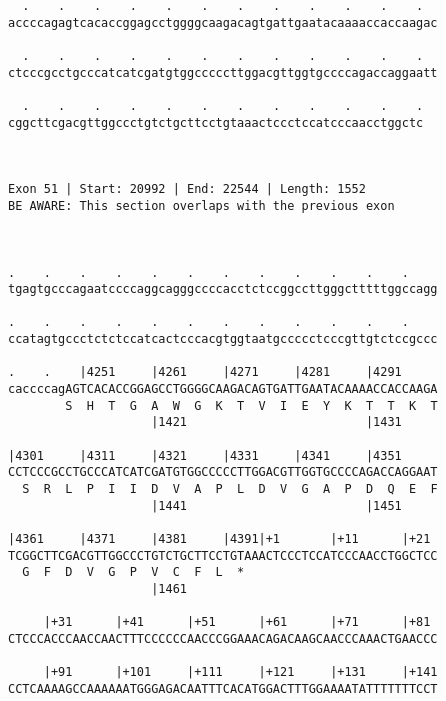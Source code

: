 \documentclass{article}
\begin{document}
\begin{Verbatim}
  .    .    .    .    .    .    .    .    .    .    .    .  
accccagagtcacaccggagcctggggcaagacagtgattgaatacaaaaccaccaagac
                                                            
  .    .    .    .    .    .    .    .    .    .    .    .  
ctcccgcctgcccatcatcgatgtggcccccttggacgttggtgccccagaccaggaatt
                                                            
  .    .    .    .    .    .    .    .    .    .    .    .
cggcttcgacgttggccctgtctgcttcctgtaaactccctccatcccaacctggctc
                                                          
                                                          
 
Exon 51 | Start: 20992 | End: 22544 | Length: 1552
BE AWARE: This section overlaps with the previous exon



.    .    .    .    .    .    .    .    .    .    .    .    
tgagtgcccagaatccccaggcagggccccacctctccggccttgggctttttggccagg
                                                            
.    .    .    .    .    .    .    .    .    .    .    .    
ccatagtgccctctctccatcactcccacgtggtaatgccccctcccgttgtctccgccc
                                                            
.    .    |4251     |4261     |4271     |4281     |4291     
caccccagAGTCACACCGGAGCCTGGGGCAAGACAGTGATTGAATACAAAACCACCAAGA
        S  H  T  G  A  W  G  K  T  V  I  E  Y  K  T  T  K  T
                    |1421                         |1431     
  
|4301     |4311     |4321     |4331     |4341     |4351     
CCTCCCGCCTGCCCATCATCGATGTGGCCCCCTTGGACGTTGGTGCCCCAGACCAGGAAT
  S  R  L  P  I  I  D  V  A  P  L  D  V  G  A  P  D  Q  E  F
                    |1441                         |1451     
  
|4361     |4371     |4381     |4391|+1       |+11      |+21 
TCGGCTTCGACGTTGGCCCTGTCTGCTTCCTGTAAACTCCCTCCATCCCAACCTGGCTCC
  G  F  D  V  G  P  V  C  F  L  *   
                    |1461                                   
  
     |+31      |+41      |+51      |+61      |+71      |+81 
CTCCCACCCAACCAACTTTCCCCCCAACCCGGAAACAGACAAGCAACCCAAACTGAACCC
                                                            
     |+91      |+101     |+111     |+121     |+131     |+141
CCTCAAAAGCCAAAAAATGGGAGACAATTTCACATGGACTTTGGAAAATATTTTTTTCCT
                                                            

\end{Verbatim}
\end{document}
